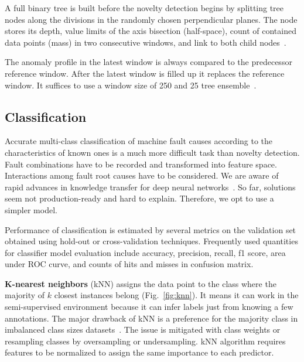 A full binary tree is built before the novelty detection begins by splitting tree nodes along the divisions in the randomly chosen perpendicular planes. The node stores its depth, value limits of the axis bisection (half-space), count of contained data points (mass) in two consecutive windows, and link to both child nodes~\cite{tan_fast_2011}. 

The anomaly profile in the latest window is always compared to the predecessor reference window. After the latest window is filled up it replaces the reference window. It suffices to use a window size of 250 and 25 tree ensemble~\cite{tan_fast_2011}.

\subsection{Classification}
Accurate multi-class classification of machine fault causes according to the characteristics of known ones is a much more difficult task than novelty detection. Fault combinations have to be recorded and transformed into feature space. Interactions among fault root causes have to be considered. We are aware of rapid advances in knowledge transfer for deep neural networks~\cite{maurya_condition-based_2021}. So far, solutions seem not production-ready and hard to explain. Therefore, we opt to use a simpler model.

Performance of classification is estimated by several metrics on the validation set obtained using hold-out or cross-validation techniques. Frequently used quantities for classifier model evaluation include accuracy, precision, recall, f1 score, area under ROC curve, and counts of hits and misses in confusion matrix.
\bigbreak

\textbf{K-nearest neighbors} (kNN) assigns the data point to the class where the majority of $k$ closest instances belong (Fig.~\ref{fig:knn}). It means it can work in the semi-supervised environment because it can infer labels just from knowing a few annotations. The major drawback of kNN is a preference for the majority class in imbalanced class sizes datasets~\cite{shi_improving_2020}. The issue is mitigated with class weights or resampling classes by oversampling or undersampling. kNN algorithm requires features to be normalized to assign the same importance to each predictor.

